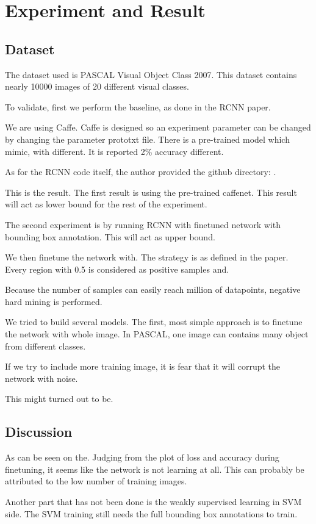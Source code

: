 \documentclass[a4paper,11pt]{kth-mag}
\begin{document}
\chapter{Experiment and Result}
\section{Dataset}
The dataset used is PASCAL Visual Object Class 2007. This dataset contains nearly 10000 images of 20 different visual classes.

To validate, first we perform the baseline, as done in the RCNN paper.

We are using Caffe.
Caffe is designed so an experiment parameter can be changed by changing the parameter prototxt file.
There is a pre-trained model which mimic, with different. It is reported 2\% accuracy different.

As for the RCNN code itself, the author provided the github directory: .

This is the result.
The first result is using the pre-trained caffenet. This result will act as lower bound for the rest of the experiment.

The second experiment is by running RCNN with finetuned network with bounding box annotation. This will act as upper bound.

We then finetune the network with. The strategy is as defined in the paper. Every region with 0.5 is considered as positive samples and.

Because the number of samples can easily reach million of datapoints, negative hard mining is performed.

We tried to build several models. The first, most simple approach is to finetune the network with whole image. In PASCAL, one image can contains many object from different classes.

If we try to include more training image, it is fear that it will corrupt the network with noise.

This might turned out to be.

\section{Discussion}
As can be seen on the. Judging from the plot of loss and accuracy during finetuning, it seems like the network is not learning at all.
This can probably be attributed to the low number of training images.

Another part that has not been done is the weakly supervised learning in SVM side. The SVM training still needs the full bounding box annotations to train.
\end{document}
